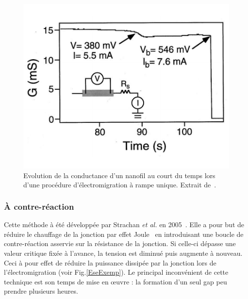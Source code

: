 \begin{figure}
\parbox{7cm}{
\includegraphics[scale=0.45]{Fabrication/ElecMigExemp/ParkFig.pdf} 
}
\parbox{5cm}{\caption{Evolution de la conductance d'un nanofil au court du temps lors d'une procédure d'électromigration à rampe unique. Extrait de~\cite{Park1999}.}
\label{ParkExemp}
}
\end{figure}



\subsubsection{À contre-réaction}
Cette méthode à été développée par Strachan \textit{et al.} en 2005~\cite{Strachan2005}. Elle a pour but de réduire le chauffage de la jonction par effet Joule~\cite{Esen2005} en introduisant une boucle de contre-réaction asservie sur la résistance de la jonction. Si celle-ci dépasse une valeur critique fixée à l'avance, la tension est diminué puis augmente à nouveau. Ceci à pour effet de réduire la puissance dissipée par la jonction lors de l'électromigration (voir Fig.\ref{EseExemp}). Le principal inconvénient de cette technique est son temps de mise en œuvre : la formation d'un seul gap peu prendre plusieurs heures.



